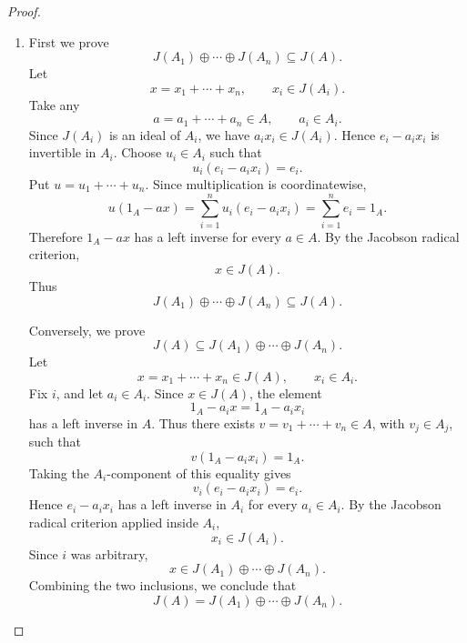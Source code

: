 \begin{proof}
\begin{enumerate}
        \item First we prove
              \[
                  J(A_1)\oplus\cdots\oplus J(A_n)\subseteq J(A).
              \]
              Let
              \[
                  x=x_1+\cdots+x_n,\qquad x_i\in J(A_i).
              \]
              Take any
              \[
                  a=a_1+\cdots+a_n\in A,\qquad a_i\in A_i.
              \]
              Since \(J(A_i)\) is an ideal of \(A_i\), we have \(a_i x_i\in J(A_i)\). Hence
              \(e_i-a_i x_i\) is invertible in \(A_i\). Choose \(u_i\in A_i\) such that
              \[
                  u_i(e_i-a_i x_i)=e_i.
              \]
              Put \(u=u_1+\cdots+u_n\). Since multiplication is coordinatewise,
              \[
                  u(1_A-ax)
                  =
                  \sum_{i=1}^n u_i(e_i-a_i x_i)
                  =
                  \sum_{i=1}^n e_i
                  =
                  1_A.
              \]
              Therefore \(1_A-ax\) has a left inverse for every \(a\in A\). By the Jacobson
              radical criterion,
              \[
                  x\in J(A).
              \]
              Thus
              \[
                  J(A_1)\oplus\cdots\oplus J(A_n)\subseteq J(A).
              \]

              Conversely, we prove
              \[
                  J(A)\subseteq J(A_1)\oplus\cdots\oplus J(A_n).
              \]
              Let
              \[
                  x=x_1+\cdots+x_n\in J(A),\qquad x_i\in A_i.
              \]
              Fix \(i\), and let \(a_i\in A_i\). Since \(x\in J(A)\), the element
              \[
                  1_A-a_i x=1_A-a_i x_i
              \]
              has a left inverse in \(A\). Thus there exists \(v=v_1+\cdots+v_n\in A\), with
              \(v_j\in A_j\), such that
              \[
                  v(1_A-a_i x_i)=1_A.
              \]
              Taking the \(A_i\)-component of this equality gives
              \[
                  v_i(e_i-a_i x_i)=e_i.
              \]
              Hence \(e_i-a_i x_i\) has a left inverse in \(A_i\) for every \(a_i\in A_i\). By the
              Jacobson radical criterion applied inside \(A_i\),
              \[
                  x_i\in J(A_i).
              \]
              Since \(i\) was arbitrary,
              \[
                  x\in J(A_1)\oplus\cdots\oplus J(A_n).
              \]
              Combining the two inclusions, we conclude that
              \[
                  J(A)=J(A_1)\oplus\cdots\oplus J(A_n).
              \]
    \end{enumerate}
\end{proof}

